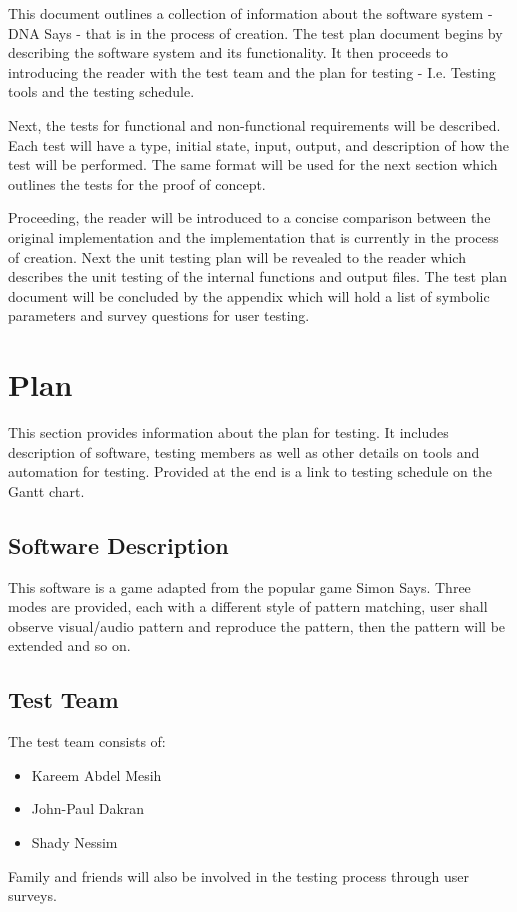 \documentclass[12pt, titlepage]{article}
\begin{document}
\par This document outlines a collection of information about the software system - DNA Says - that is in the process of creation. The test plan document begins by describing the software system and its functionality. It then proceeds to introducing the reader with the test team and the plan for testing - I.e. Testing tools and the testing schedule.
\\
\par Next, the tests for functional and non-functional requirements will be described. Each test will have a type, initial state, input, output, and description of how the test will be performed. The same format will be used for the next section which outlines the tests for the proof of concept.
\\
\par Proceeding, the reader will be introduced to a concise comparison between the original implementation and the implementation that is currently in the process of creation. Next the unit testing plan will be revealed to the reader which describes the unit testing of the internal functions and output files. The test plan document will be concluded by the appendix which will hold a list of symbolic parameters and survey questions for user testing.


\section{Plan}
\par This section provides information about the plan for testing. It includes description of software, testing members as well as other details on tools and automation for testing. Provided at the end is a link to testing schedule on the Gantt chart.
\subsection{Software Description}
This software is a game adapted from the popular game Simon Says. Three modes are provided, each with a different style of pattern matching, user shall observe visual/audio pattern  and reproduce the pattern, then the pattern will be extended and so on.
\subsection{Test Team}
The test team consists of:
\begin{itemize}
  \item Kareem Abdel Mesih
  \item John-Paul Dakran
  \item Shady Nessim
\end{itemize}
Family and friends will also be involved in the testing process through user surveys.
\end{document}
